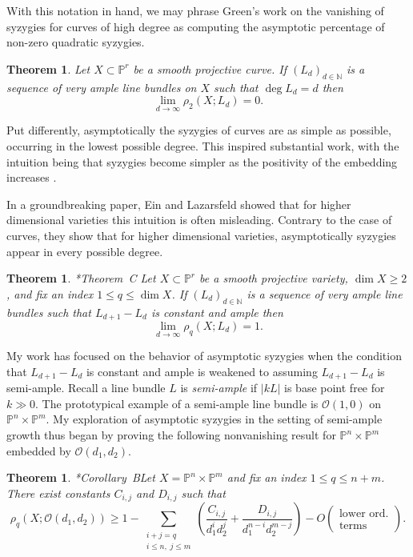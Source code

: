 \documentclass[11pt,reqno]{amsart}
\newtheorem{theorem}[lemma]{Theorem}
\theoremstyle{remark}
\renewcommand{\O}{\mathcal{O}}
\newcommand{\N}{\mathbb{N}}
\renewcommand{\P}{\mathbb{P}}
\begin{document}
With this notation in hand, we may phrase Green's work on the vanishing of syzygies for curves of high degree as computing the asymptotic percentage of non-zero quadratic syzygies. 

\begin{theorem}\cite{green84-I}
Let $X\subset \P^r$ be a smooth projective curve. If $(L_{d})_{d\in\N}$ is a sequence of very ample line bundles on $X$ such that $\deg L_{d} = d$ then 
\[
\lim_{d\to \infty} \rho_{2}\left(X;L_{d}\right) = 0.
\]
\end{theorem}

Put differently, asymptotically the syzygies of curves are as simple as possible, occurring in the lowest possible degree. This inspired substantial work, with the intuition being that syzygies become simpler as the positivity of the embedding increases \cite{ottavianiPaoletti01, einLazarsfeld93, lazarsfeldPareschiPopa11, pareschi00, pareschiPopa03, pareschiPopa04}.  

In a groundbreaking paper, Ein and Lazarsfeld showed that for higher dimensional varieties this intuition is often misleading. Contrary to the case of curves, they show that for higher dimensional varieties, asymptotically syzygies appear in every possible degree. 
  
\begin{theorem}\cite{einLazarsfeld12}*{Theorem~C}
Let $X\subset \P^r$ be a smooth projective variety, $\dim X \geq2$, and fix an index $1\leq q \leq \dim X$. If $(L_{d})_{d\in\N}$ is a sequence of very ample line bundles such that $L_{d+1}-L_{d}$ is constant and ample then
\[
\lim_{d\to\infty} \rho_{q}\left(X; L_d\right) = 1.
\]
\end{theorem}

My work has focused on the behavior of asymptotic syzygies when the condition that $L_{d+1}-L_{d}$ is constant and ample is weakened to assuming $L_{d+1}-L_{d}$ is semi-ample. Recall a line bundle $L$ is \textit{semi-ample} if $|kL|$ is base point free for $k\gg0$. The prototypical example of a semi-ample line bundle is $\O(1,0)$ on $\P^{n}\times \P^{m}$. My exploration of asymptotic syzygies in the setting of semi-ample growth thus began by proving the following nonvanishing result for $\P^{n}\times\P^{m}$ embedded by $\O(d_{1},d_{2})$. 

\begin{theorem}\cite{bruce19-semiample}*{Corollary~B}\label{thm:bruce-semiample}
Let $X=\P^{n}\times\P^{m}$ and fix an index $1\leq q \leq n+m$. There exist constants $C_{i,j}$ and $D_{i,j}$ such that
\[
\rho_{q}\left(X; \O\left(d_1,d_2\right)\right)\geq1-\sum_{\substack{i+j=q \\  i \leq n, \; j \leq m}}\left(
\frac{C_{i,j}}{d_1^id_2^j}+\frac{D_{i,j}}{d_1^{n-i}d_2^{m-j}}\right)-O\left(\begin{matrix}\text{lower ord.}\\ \text{terms}\end{matrix}\right).
\]
\end{theorem}
\end{document}

